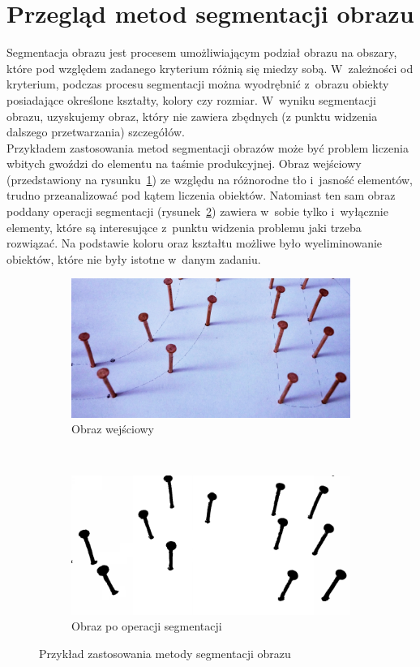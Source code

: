 \section{Przegląd metod segmentacji obrazu}
Segmentacja obrazu jest procesem umożliwiającym podział obrazu na obszary, które pod względem zadanego kryterium różnią się miedzy sobą. W~zależności od kryterium, podczas procesu segmentacji można wyodrębnić z~obrazu obiekty posiadające określone kształty, kolory czy rozmiar. W~wyniku segmentacji obrazu, uzyskujemy obraz, który nie zawiera zbędnych (z punktu widzenia dalszego przetwarzania) szczegółów.\\
Przykładem zastosowania metod segmentacji obrazów może być problem liczenia wbitych gwoździ do elementu na taśmie produkcyjnej. Obraz wejściowy (przedstawiony na rysunku~\ref{fig:gwozdzie_input}) ze względu na różnorodne tło i~jasność elementów, trudno przeanalizować pod kątem liczenia obiektów. Natomiast ten sam obraz poddany operacji segmentacji (rysunek~\ref{fig:gwozdzie_output}) zawiera w~sobie tylko i~wyłącznie elementy, które są interesujące z~punktu widzenia problemu jaki trzeba rozwiązać. Na podstawie koloru oraz kształtu możliwe było wyeliminowanie obiektów, które nie były istotne w~danym zadaniu.

\begin{figure}[H]
  \centering
  \begin{subfigure}[b]{0.48\textwidth}
    \includegraphics[width=\textwidth]{img/gwozdzie-input}
    \caption{Obraz wejściowy}
    \label{fig:gwozdzie_input}
  \end{subfigure}
  ~
  \begin{subfigure}[b]{0.48\textwidth}
    \includegraphics[width=\textwidth]{img/gwozdzie-output}
    \caption{Obraz po operacji segmentacji}
    \label{fig:gwozdzie_output}
  \end{subfigure}
  \caption{Przykład zastosowania metody segmentacji obrazu}\label{fig:gwozdzie}
\end{figure}

